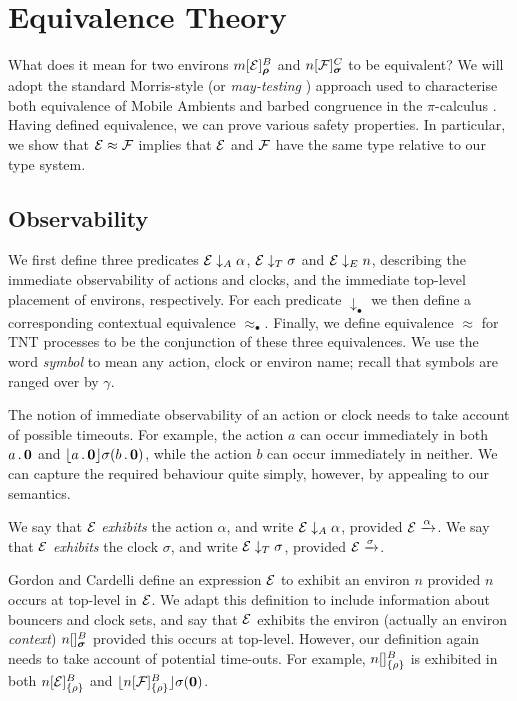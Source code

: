 \documentclass[orivec,envcountsame]{llncs}
\newcommand{\Exhibits}[1]{\mathrel{\downarrow_{#1}}}
\newcommand{\ExhibitsA}{\Exhibits{A}}
\newcommand{\ExhibitsT}{\Exhibits{T}}
\newcommand{\ExhibitsE}{\Exhibits{E}}
\newcommand{\Eq}{\approx}
\newcommand{\Does}[1]{\xderives{#1}}
\begin{document}
\section{Equivalence Theory}
\label{sec:equivalence-theory}

What does it mean for two environs $\locv{m}{\expr}{B}{\vec\rho}$ and
$\locv{n}{\exprb}{C}{\vec\sigma}$ to be equivalent? We will adopt the standard
Morris-style \cite{Mor68} (or \emph{may-testing} \cite{DNH84}) approach used to
characterise both equivalence of Mobile Ambients \cite{GC99} and barbed
congruence in the $\pi$-calculus \cite{sangiorgi:book}. Having defined
equivalence, we can prove various safety properties. In particular, we show that
$\expr \Eq \exprb$ implies that $\text{$\mathcal{E}$}$ and $\text{$\mathcal{F}$}$ have the same type relative
to our type system.

\subsection{Observability}
\label{sec:observability}

We first define three predicates $\expr \ExhibitsA \alpha$, $\expr \ExhibitsT
\sigma$ and $\expr \ExhibitsE n$, describing the immediate observability of
actions and clocks, and the immediate top-level placement of environs,
respectively. For each predicate $\Exhibits{\bullet}$ we then define a
corresponding contextual equivalence $\Eq_{\bullet}$. Finally, we define
equivalence $\Eq$ for TNT processes to be the conjunction of these three
equivalences. We use the word \emph{symbol} to mean any action, clock or environ
name; recall that symbols are ranged over by $\gamma$.

The notion of immediate observability of an action or clock needs to take
account of possible timeouts. For example, the action $a$ can occur immediately
in both $a\,.\,\textbf{0}$ and $\lfloor{a\,.\,\textbf{0}}\rfloor {\sigma} ({b\,.\,\textbf{0}})$, while the
action $b$ can occur immediately in neither. We can capture the required
behaviour quite simply, however, by appealing to our semantics.

\begin{definition}
We say that $\text{$\mathcal{E}$}$ \emph{exhibits} the action $\alpha$, and write $\expr
\ExhibitsA \alpha$, provided $\expr \Does{\alpha}$. We say that $\text{$\mathcal{E}$}$
\emph{exhibits} the clock $\sigma$, and write $\expr \ExhibitsT \sigma$,
provided $\expr \Does{\sigma}$.
\end{definition}

Gordon and Cardelli \cite{GC99} define an expression $\text{$\mathcal{E}$}$ to exhibit an
environ $n$ provided $n$ occurs at top-level in $\text{$\mathcal{E}$}$. We adapt this
definition to include information about bouncers and clock sets, and say that
$\text{$\mathcal{E}$}$ exhibits the environ (actually an environ \emph{context})
$\locv{n}{}{B}{\vec{\sigma}}$ provided this occurs at top-level. However, our
definition again needs to take account of potential time-outs. For example,
${n}[  ]^{B}_{\{\rho\}}$ is exhibited in both ${n}[ \text{$\mathcal{E}$} ]^{B}_{\{\rho\}}$ and
$\lfloor{{n}[ \text{$\mathcal{F}$}]^{B}_{\{\rho\}}}\rfloor {\sigma} ({\textbf{0}})$.
\end{document}
